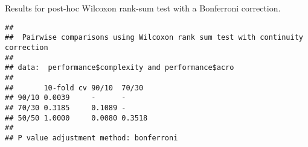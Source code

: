 \documentclass[
]{book}
\newenvironment{Shaded}{\begin{snugshade}}{\end{snugshade}}
\newcommand{\AttributeTok}[1]{\textcolor[rgb]{0.13,0.29,0.53}{#1}}
\newcommand{\ConstantTok}[1]{\textcolor[rgb]{0.56,0.35,0.01}{#1}}
\newcommand{\FunctionTok}[1]{\textcolor[rgb]{0.13,0.29,0.53}{\textbf{#1}}}
\newcommand{\NormalTok}[1]{#1}
\newcommand{\SpecialCharTok}[1]{\textcolor[rgb]{0.81,0.36,0.00}{\textbf{#1}}}
\newcommand{\StringTok}[1]{\textcolor[rgb]{0.31,0.60,0.02}{#1}}
\begin{document}
Results for post-hoc Wilcoxon rank-sum test with a Bonferroni correction.

\begin{Shaded}
\end{Shaded}

\begin{verbatim}
## 
##  Pairwise comparisons using Wilcoxon rank sum test with continuity correction 
## 
## data:  performance$complexity and performance$acro 
## 
##       10-fold cv 90/10  70/30 
## 90/10 0.0039     -      -     
## 70/30 0.3185     0.1089 -     
## 50/50 1.0000     0.0080 0.3518
## 
## P value adjustment method: bonferroni
\end{verbatim}

  
\end{document}
